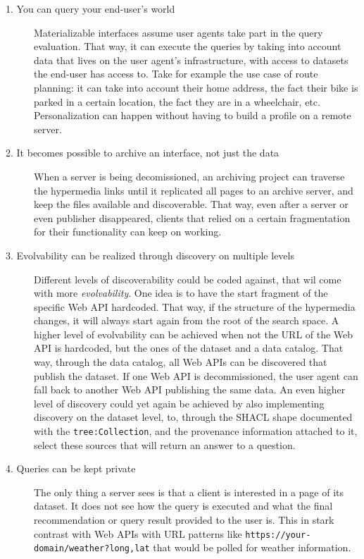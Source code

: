 \documentclass[
]{ceurart}
\begin{document}
\begin{description}
\item[1. You can query your end-user’s world]
Materializable interfaces assume user agents take part in the query evaluation.
That way, it can execute the queries by taking into account data that lives on the user agent’s infrastructure, with access to datasets the end-user has access to. Take for example the use case of route planning: it can take into account their home address, the fact their bike is parked in a certain location, the fact they are in a wheelchair, etc. Personalization can happen without having to build a profile on a remote server.
 \item[2. It becomes possible to archive an interface, not just the data]
 When a server is being decomissioned, an archiving project can traverse the hypermedia links until it replicated all pages to an archive server, and keep the files available and discoverable. That way, even after a server or even publisher disappeared, clients that relied on a certain fragmentation for their functionality can keep on working.
 \item[3. Evolvability can be realized through discovery on multiple levels]
 Different levels of discoverability could be coded against, that wil come with more \textit{evolvability}.
 One idea is to have the start fragment of the specific Web API hardcoded. That way, if the structure of the hypermedia changes, it will always start again from the root of the search space.
 A higher level of evolvability can be achieved when not the URL of the Web API is hardcoded, but the ones of the dataset and a data catalog. That way, through the data catalog, all Web APIs can be discovered that publish the dataset. If one Web API is decommissioned, the user agent can fall back to another Web API publishing the same data. An even higher level of discovery could yet again be achieved by also implementing discovery on the dataset level, to, through the SHACL shape documented with the \texttt{tree:Collection}, and the provenance information attached to it, select these sources that will return an answer to a question.
 \item[4. Queries can be kept private]
The only thing a server sees is that a client is interested in a page of its dataset. It does not see how the query is executed and what the final recommendation or query result provided to the user is. This in stark contrast with Web APIs with URL patterns like \texttt{https://your-domain/weather{?long,lat}} that would be polled for weather information.
\end{description}
\end{document}

